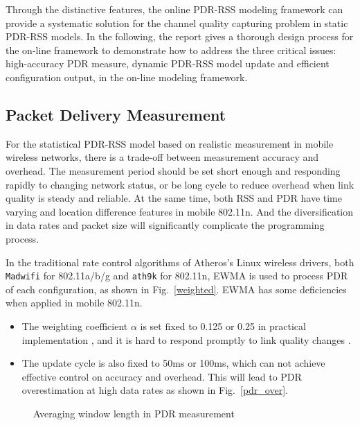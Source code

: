 \documentclass[draftclsnofoot,journal,onecolumn,11pt]{IEEEtran}
\begin{document}
Through the distinctive features, the online PDR-RSS modeling framework can provide a systematic solution for the channel quality capturing problem in static PDR-RSS models. In the following, the report gives a thorough design process for the on-line framework to demonstrate how to address the three critical issues: high-accuracy PDR measure, dynamic PDR-RSS model update and efficient configuration output, in the on-line modeling framework.

\subsection{Packet Delivery Measurement} \label{sect:methodology}
For the statistical PDR-RSS model based on realistic measurement in mobile wireless networks, there is a trade-off between measurement accuracy and overhead. The measurement period should be set short enough and responding rapidly to changing network status, or be long cycle to reduce overhead when link quality is steady and reliable. At the same time, both RSS and PDR have time varying and location difference features in mobile 802.11n. And the diversification in data rates and packet size will significantly complicate the programming process.

In the traditional rate control algorithms of Atheros's Linux wireless drivers, both \texttt{Madwifi} for 802.11a/b/g and \texttt{ath9k} \cite{ath9k} for 802.11n, EWMA is used to process PDR of each configuration, as shown in Fig.~\ref{weighted}. EWMA has some deficiencies when applied in mobile 802.11n.

\begin{itemize}
  \item The weighting coefficient $\alpha$ is set fixed to 0.125 or 0.25 in practical implementation \cite{ath9k} \cite{minstrel}, and it is hard to respond promptly to link quality changes \cite{EWMAChart}.
  \item The update cycle is also fixed to 50ms or 100ms, which can not achieve effective control on accuracy and overhead. This will lead to PDR overestimation at high data rates as shown in Fig.~\ref{pdr_over}.
\end{itemize}

\begin{figure}[!htp]
\centerline{
}
\caption{Averaging window length in PDR measurement}
\label{method}
\end{figure}
\end{document}
